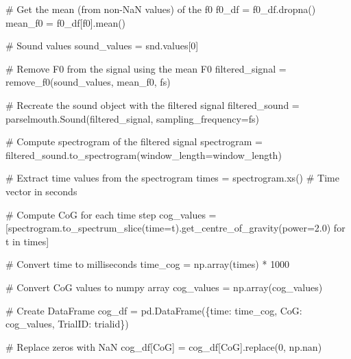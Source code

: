 \documentclass[
  letterpaper,
  DIV=11,
  numbers=noendperiod]{scrreprt}
\newenvironment{Shaded}{\begin{snugshade}}{\end{snugshade}}
\newcommand{\CommentTok}[1]{\textcolor[rgb]{0.37,0.37,0.37}{#1}}
\newcommand{\ControlFlowTok}[1]{\textcolor[rgb]{0.00,0.23,0.31}{#1}}
\newcommand{\DecValTok}[1]{\textcolor[rgb]{0.68,0.00,0.00}{#1}}
\newcommand{\FloatTok}[1]{\textcolor[rgb]{0.68,0.00,0.00}{#1}}
\newcommand{\KeywordTok}[1]{\textcolor[rgb]{0.00,0.23,0.31}{#1}}
\newcommand{\NormalTok}[1]{\textcolor[rgb]{0.00,0.23,0.31}{#1}}
\newcommand{\OperatorTok}[1]{\textcolor[rgb]{0.37,0.37,0.37}{#1}}
\newcommand{\StringTok}[1]{\textcolor[rgb]{0.13,0.47,0.30}{#1}}
\begin{document}
\begin{Shaded}
\begin{Highlighting}[]
    \CommentTok{\# Get the mean (from non{-}NaN values) of the f0}
\NormalTok{    f0\_df }\OperatorTok{=}\NormalTok{ f0\_df.dropna()}
\NormalTok{    mean\_f0 }\OperatorTok{=}\NormalTok{ f0\_df[}\StringTok{\textquotesingle{}f0\textquotesingle{}}\NormalTok{].mean()}

    \CommentTok{\# Sound values}
\NormalTok{    sound\_values }\OperatorTok{=}\NormalTok{ snd.values[}\DecValTok{0}\NormalTok{]}

    \CommentTok{\# Remove F0 from the signal using the mean F0}
\NormalTok{    filtered\_signal }\OperatorTok{=}\NormalTok{ remove\_f0(sound\_values, mean\_f0, fs)}

    \CommentTok{\# Recreate the sound object with the filtered signal}
\NormalTok{    filtered\_sound }\OperatorTok{=}\NormalTok{ parselmouth.Sound(filtered\_signal, sampling\_frequency}\OperatorTok{=}\NormalTok{fs)}

    \CommentTok{\# Compute spectrogram of the filtered signal}
\NormalTok{    spectrogram }\OperatorTok{=}\NormalTok{ filtered\_sound.to\_spectrogram(window\_length}\OperatorTok{=}\NormalTok{window\_length)}

    \CommentTok{\# Extract time values from the spectrogram}
\NormalTok{    times }\OperatorTok{=}\NormalTok{ spectrogram.xs()  }\CommentTok{\# Time vector in seconds}

    \CommentTok{\# Compute CoG for each time step}
\NormalTok{    cog\_values }\OperatorTok{=}\NormalTok{ [spectrogram.to\_spectrum\_slice(time}\OperatorTok{=}\NormalTok{t).get\_centre\_of\_gravity(power}\OperatorTok{=}\FloatTok{2.0}\NormalTok{) }\ControlFlowTok{for}\NormalTok{ t }\KeywordTok{in}\NormalTok{ times]}

    \CommentTok{\# Convert time to milliseconds}
\NormalTok{    time\_cog }\OperatorTok{=}\NormalTok{ np.array(times) }\OperatorTok{*} \DecValTok{1000}  

    \CommentTok{\# Convert CoG values to numpy array}
\NormalTok{    cog\_values }\OperatorTok{=}\NormalTok{ np.array(cog\_values)}

    \CommentTok{\# Create DataFrame}
\NormalTok{    cog\_df }\OperatorTok{=}\NormalTok{ pd.DataFrame(\{}\StringTok{\textquotesingle{}time\textquotesingle{}}\NormalTok{: time\_cog, }\StringTok{\textquotesingle{}CoG\textquotesingle{}}\NormalTok{: cog\_values, }\StringTok{\textquotesingle{}TrialID\textquotesingle{}}\NormalTok{: trialid\})}

    \CommentTok{\# Replace zeros with NaN}
\NormalTok{    cog\_df[}\StringTok{\textquotesingle{}CoG\textquotesingle{}}\NormalTok{] }\OperatorTok{=}\NormalTok{ cog\_df[}\StringTok{\textquotesingle{}CoG\textquotesingle{}}\NormalTok{].replace(}\DecValTok{0}\NormalTok{, np.nan)}


\end{Highlighting}
\end{Shaded}
\end{document}
